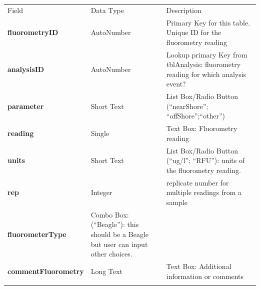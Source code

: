 \documentclass[]{article}
\begin{document}
\begin{longtable}[c]{@{}lll@{}}
\toprule\addlinespace
Field & Data Type & Description
\\\addlinespace
\midrule\endhead
\textbf{fluorometryID} & AutoNumber & Primary Key for this table. Unique
ID for the fluorometry reading
\\\addlinespace
\textbf{analysisID} & AutoNumber & Lookup primary Key from tblAnalysis:
fluorometry reading for which analysis event?
\\\addlinespace
\textbf{parameter} & Short Text & List Box/Radio Button (``nearShore'';
``offShore'';``other'')
\\\addlinespace
\textbf{reading} & Single & Text Box: Fluorometry reading
\\\addlinespace
\textbf{units} & Short Text & List Box/Radio Button (``ug/l''; ``RFU''):
units of the fluorometry reading.
\\\addlinespace
\textbf{rep} & Integer & replicate number for multiple readings from a
sample
\\\addlinespace
\textbf{fluorometerType} & Combo Box: (``Beagle''): this should be a
Beagle but user can input other choices.
\\\addlinespace
\textbf{commentFluorometry} & Long Text & Text Box: Additional
information or comments
\\\addlinespace
\bottomrule
\end{longtable}
\end{document}
